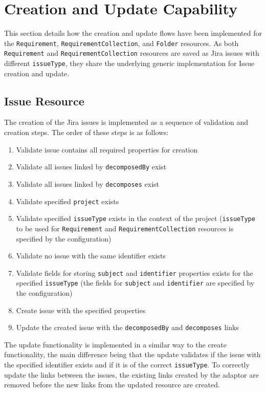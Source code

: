 \section{Creation and Update Capability}
This section details how the creation and update flows have been implemented for the \texttt{Requirement}, \texttt{RequirementCollection}, and \texttt{Folder} resources. As both \texttt{Requirement} and \texttt{RequirementCollection} resources are saved as Jira issues with different \texttt{issueType}, they share the underlying generic implementation for Issue creation and update.

\subsection*{Issue Resource}
The creation of the Jira issues is implemented as a sequence of validation and creation steps. The order of these steps is as follows:

\begin{enumerate}
  \item Validate issue contains all required properties for creation
  \item Validate all issues linked by \texttt{decomposedBy} exist
  \item Validate all issues linked by \texttt{decomposes} exist
  \item Validate specified \texttt{project} exists
  \item Validate specified \texttt{issueType} exists in the context of the project (\texttt{issueType} to be used for \texttt{Requirement} and \texttt{RequirementCollection} resources is specified by the configuration)
  \item Validate no issue with the same identifier exists
  \item Validate fields for storing \texttt{subject} and \texttt{identifier} properties exists for the specified \texttt{issueType} (the fields for \texttt{subject} and \texttt{identifier} are specified by the configuration)
  \item Create issue with the specified properties
  \item Update the created issue with the \texttt{decomposedBy} and \texttt{decomposes} links
\end{enumerate}

The update functionality is implemented in a similar way to the create functionality, the main difference being that the update validates if the issue with the specified identifier exists and if it is of the correct \texttt{issueType}. To correctly update the links between the issues, the existing links created by the adaptor are removed before the new links from the updated resource are created.

